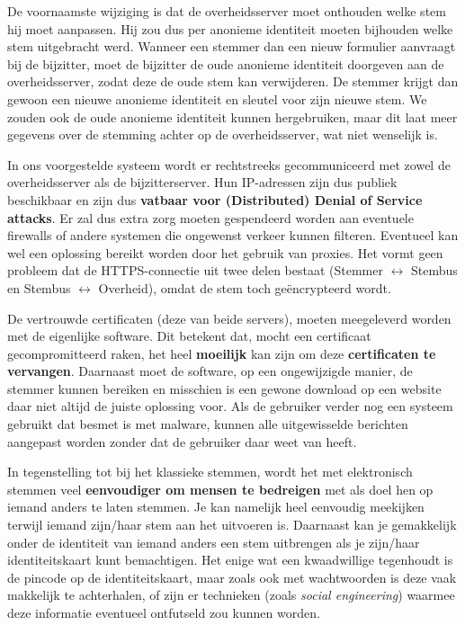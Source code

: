 \documentclass[a4paper,12pt]{article}
\begin{document}
De voornaamste wijziging is dat de overheidsserver moet onthouden welke stem hij
moet aanpassen. Hij zou dus per anonieme identiteit moeten bijhouden welke stem
uitgebracht werd. Wanneer een stemmer dan een nieuw formulier aanvraagt bij de
bijzitter, moet de bijzitter de oude anonieme identiteit doorgeven aan de
overheidsserver, zodat deze de oude stem kan verwijderen. De stemmer krijgt dan
gewoon een nieuwe anonieme identiteit en sleutel voor zijn nieuwe stem. We
zouden ook de oude anonieme identiteit kunnen hergebruiken, maar dit laat meer
gegevens over de stemming achter op de overheidsserver, wat niet wenselijk is.

In ons voorgestelde systeem wordt er rechtstreeks gecommuniceerd met zowel
de overheidsserver als de bijzitterserver. Hun IP-adressen zijn dus publiek
beschikbaar en zijn dus \textbf{vatbaar voor (Distributed) Denial of Service
attacks}. Er zal dus extra zorg moeten gespendeerd worden aan eventuele
firewalls of andere systemen die ongewenst verkeer kunnen filteren. Eventueel
kan wel een oplossing bereikt worden door het gebruik van proxies. Het
vormt geen probleem dat de HTTPS-connectie uit twee delen bestaat (Stemmer
$\leftrightarrow$ Stembus en Stembus $\leftrightarrow$ Overheid), omdat de stem
toch ge\"encrypteerd wordt.

De vertrouwde certificaten (deze van beide servers), moeten meegeleverd
worden met de eigenlijke software. Dit betekent dat, mocht een certificaat
gecompromitteerd raken, het heel \textbf{moeilijk} kan zijn om deze
\textbf{certificaten te vervangen}. Daarnaast moet de software, op een
ongewijzigde manier, de stemmer kunnen bereiken en misschien is een gewone
download op een website daar niet altijd de juiste oplossing voor. Als de
gebruiker verder nog een systeem gebruikt dat besmet is met malware, kunnen alle
uitgewisselde berichten aangepast worden zonder dat de gebruiker daar weet van
heeft.

In tegenstelling tot bij het klassieke stemmen, wordt het met elektronisch
stemmen veel \textbf{eenvoudiger om mensen te bedreigen} met als doel hen
op iemand anders te laten stemmen. Je kan namelijk heel eenvoudig meekijken
terwijl iemand zijn/haar stem aan het uitvoeren is. Daarnaast kan je gemakkelijk
onder de identiteit van iemand anders een stem uitbrengen als je zijn/haar
identiteitskaart kunt bemachtigen. Het enige wat een kwaadwillige tegenhoudt
is de pincode op de identiteitskaart, maar zoals ook met wachtwoorden is deze
vaak makkelijk te achterhalen, of zijn er technieken (zoals \emph{social
engineering}) waarmee deze informatie eventueel ontfutseld zou kunnen worden.
\end{document}
